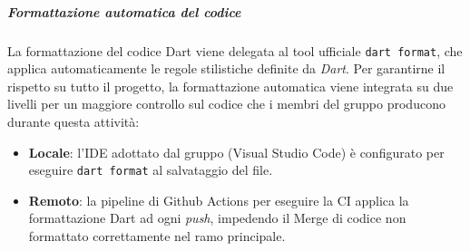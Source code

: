 \documentclass[a4paper,12pt]{article}
\begin{document}
\subparagraph{Formattazione automatica del codice} 
La formattazione del codice Dart viene delegata al tool ufficiale \texttt{dart format}, che applica automaticamente le regole stilistiche definite da \textit{Dart}. 
Per garantirne il rispetto su tutto il progetto, la formattazione automatica viene integrata su due livelli per un maggiore controllo sul 
codice che i membri del gruppo producono durante questa attività:
\begin{itemize}
    \item \textbf{Locale}: l'IDE adottato dal gruppo (Visual Studio Code) è configurato per eseguire \texttt{dart format} al salvataggio del file.
    \item \textbf{Remoto}: la pipeline di Github Actions per eseguire la CI applica la formattazione Dart ad ogni \textit{push}, 
    impedendo il Merge di codice non formattato correttamente nel ramo principale.
\end{itemize}
\end{document}
